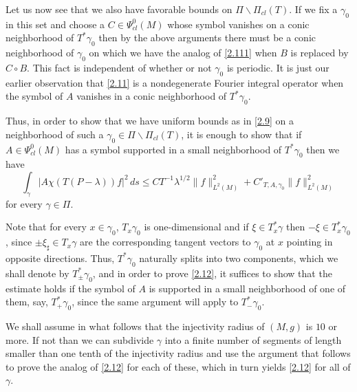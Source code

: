 \documentclass[10pt]{amsart}
\begin{document}
Let us now see that we also have favorable bounds on ${\varPi}\backslash {\varPi}_{cl}(T)$.
If we fix a $\gamma_0$ in this set and choose a $C\in \Psi^0_{cl}(M)$ whose symbol
vanishes on a conic neighborhood of $T^*\gamma_0$ then by the above arguments
there must be a conic neighborhood of $\gamma_0$ on which we have the analog of
\eqref{2.111} when $B$ is replaced by $C\circ B$.
This fact is independent of whether or not $\gamma_0$ is periodic.  It is just our earlier
observation that \eqref{2.11} is a nondegenerate Fourier integral operator when the symbol
of $A$ vanishes in a conic neighborhood of $T^*\gamma_0$.

 Thus, in order to show that we have uniform bounds as in \eqref{2.9} on a neighborhood of such a $\gamma_0\in {\varPi}\backslash {\varPi}_{cl}(T)$, it is
enough to show that if $A\in \Psi^0_{cl}(M)$ has a symbol supported in a small
neighborhood of $T^*\gamma_0$ then we have
\begin{equation}\label{2.12}
\int_\gamma |A\chi(T(P-\lambda))f|^2 \, ds \le CT^{-1}\lambda^{1/2}\|f\|_{L^2(M)}^2
+C'_{T,A,\gamma_0}\|f\|_{L^2(M)}^2
\end{equation}
for every $\gamma\in {\varPi}$.

Note that for every $x\in \gamma_0$, $T_x\gamma_0$ is one-dimensional
and if $\xi\in T_x^*\gamma$ then $-\xi\in T_x^*\gamma_0$, since $\pm \xi_\sharp
\in T_x\gamma$ are the corresponding tangent vectors to $\gamma_0$ at
$x$ pointing in opposite directions.  Thus, $T^*\gamma_0$ naturally splits
into two components, which we shall denote by $T^*_\pm \gamma_0$, and in order
to prove \eqref{2.12}, it suffices to show that the estimate holds if the symbol of $A$ is supported in
a small neighborhood of one of them, say, $T^*_+\gamma_0$, since the same argument
will apply to $T^*_-\gamma_0$.

We shall assume in what follows that the injectivity radius of $(M,g)$ is $10$ or more.
If not than we can subdivide $\gamma$ into a finite number of segments of length
smaller than one tenth of the injectivity radius and use the argument that follows to
prove the analog of \eqref{2.12} for each of these, which in turn yields \eqref{2.12}
for all of $\gamma$.
\end{document}
